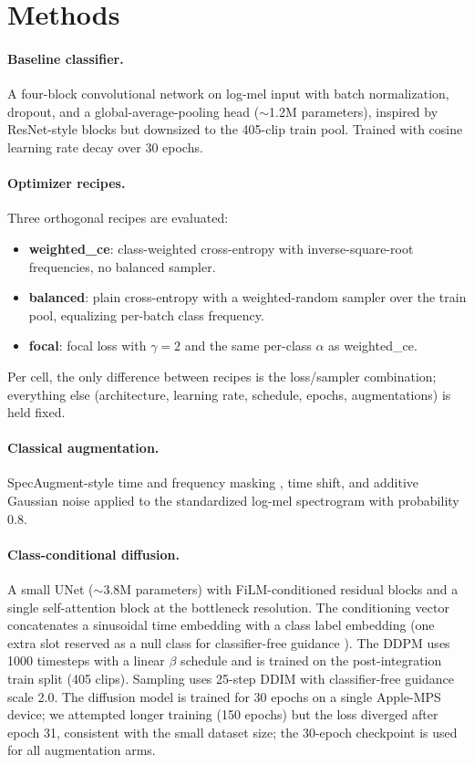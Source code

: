 \documentclass[final]{article}
\begin{document}
\section{Methods}\label{sec:approach}
\paragraph{Baseline classifier.} A four-block convolutional network on log-mel input with batch normalization, dropout, and a global-average-pooling head ($\sim$1.2M parameters), inspired by ResNet-style blocks \cite{he2016resnet} but downsized to the 405-clip train pool. Trained with cosine learning rate decay over 30 epochs.

\paragraph{Optimizer recipes.} Three orthogonal recipes are evaluated:
\begin{itemize}
    \item \textbf{weighted\_ce}: class-weighted cross-entropy with inverse-square-root frequencies, no balanced sampler.
    \item \textbf{balanced}: plain cross-entropy with a weighted-random sampler over the train pool, equalizing per-batch class frequency.
    \item \textbf{focal}: focal loss \cite{lin2017focal} with $\gamma=2$ and the same per-class $\alpha$ as weighted\_ce.
\end{itemize}
Per cell, the only difference between recipes is the loss/sampler combination; everything else (architecture, learning rate, schedule, epochs, augmentations) is held fixed.

\paragraph{Classical augmentation.} SpecAugment-style time and frequency masking \cite{park2019specaugment}, time shift, and additive Gaussian noise applied to the standardized log-mel spectrogram with probability 0.8.

\paragraph{Class-conditional diffusion.} A small UNet ($\sim$3.8M parameters) with FiLM-conditioned \cite{perez2018film} residual blocks and a single self-attention block at the bottleneck resolution. The conditioning vector concatenates a sinusoidal time embedding with a class label embedding (one extra slot reserved as a null class for classifier-free guidance \cite{ho2021classifier}). The DDPM uses 1000 timesteps with a linear $\beta$ schedule and is trained on the post-integration train split (405 clips). Sampling uses 25-step DDIM \cite{song2021ddim} with classifier-free guidance scale 2.0. The diffusion model is trained for 30 epochs on a single Apple-MPS device; we attempted longer training (150 epochs) but the loss diverged after epoch 31, consistent with the small dataset size; the 30-epoch checkpoint is used for all augmentation arms.
\end{document}

